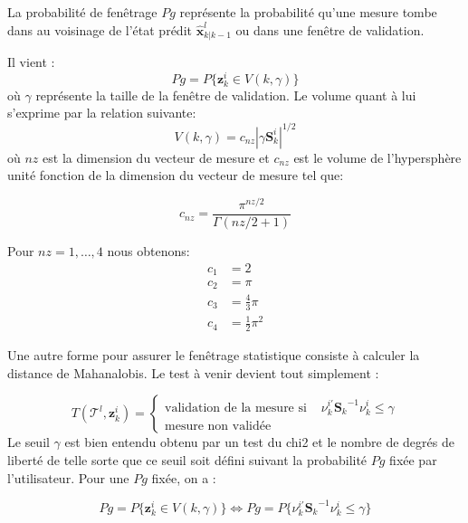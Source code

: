 \documentclass[10pt,french,a4paper]{report}
\begin{document}
		La probabilité de fenêtrage $Pg$  représente la probabilité qu'une mesure tombe dans au voisinage de l'état prédit $\hat{\mathbf{x}}_{k|k-1}^l$ ou dans une fenêtre de validation.  
		
		Il vient :
			 					\begin{equation} 
		Pg = P\{\mathbf{z}^i_k \in V(k,\gamma)\}
							\end{equation}
où $\gamma$ représente la taille de la fenêtre de validation. Le volume quant à lui s'exprime par la relation suivante:
			 					\begin{equation} 
		  V(k,\gamma) = c_{nz}|\gamma \mathbf{S}_k^i |^{1/2}
							\end{equation}
où $nz$ est la dimension du vecteur de mesure et $c_{nz}$ est le volume de l'hypersphère unité fonction de la dimension du vecteur de mesure tel que:
		
			 					\begin{equation} 
		  c_{nz} = \frac{\pi^{nz/2}}{\Gamma(nz/2+1)}
							\end{equation}
		
		Pour $nz = 1,\ldots,4$ nous obtenons:
			 					\begin{align}
		  c_{1} &= 2 \\ c_{2} &=\pi \\ c_3  &= \frac{4}{3}\pi\\ c_4  &= \frac{1}{2}\pi^2   
							\end{align}
		
		Une autre forme pour assurer le fenêtrage statistique consiste à calculer la distance de Mahanalobis. Le test à venir devient tout simplement :
		
		 	 					\begin{equation} 
		 T(\mathcal{T}^l,\mathbf{z}_k^i) = \left\{  \begin{aligned} \text{validation de la mesure si } & \nu_k^{i'}{\mathbf{S}_k}^{-1}\nu_k^i \leq \gamma \\
		 \text{mesure non validée} & 
		 \end{aligned} \right.
					 	\end{equation}	
		Le seuil $\gamma$ est bien entendu obtenu par un test du chi2 et le nombre de degrés de liberté de telle sorte que ce seuil soit défini suivant la probabilité $Pg$ fixée par l'utilisateur. Pour une $Pg$ fixée, on a :
		
		\begin{equation} 
	 	Pg = P\{\mathbf{z}^i_k \in V(k,\gamma)\} \Leftrightarrow Pg = P\{ \nu_k^{i'}{\mathbf{S}_k}^{-1}\nu_k^i \leq \gamma \}
	 	\end{equation} 
	 	
\end{document}
